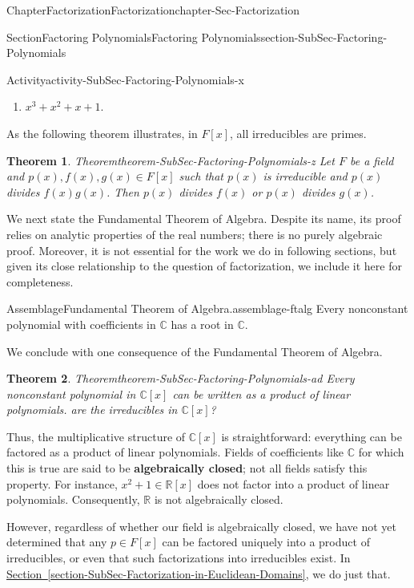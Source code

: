 \documentclass[oneside,10pt,]{book}
\newcommand{\xreffont}{\relax}
\newcommand{\terminology}[1]{\textbf{#1}}
\numberwithin{equation}{section}
\def\C{{\mathbb C}}
\def\R{{\mathbb R}}
\newtheorem{theorem}{Theorem}[section]
\begin{document}
\begin{chapterptx}{Chapter}{Factorization}{}{Factorization}{}{}{chapter-Sec-Factorization}
\begin{sectionptx}{Section}{Factoring Polynomials}{}{Factoring Polynomials}{}{}{section-SubSec-Factoring-Polynomials}
\begin{activity}{Activity}{}{activity-SubSec-Factoring-Polynomials-x}
\begin{enumerate}
\begin{enumerate}
\item{}\(x^3 + x^2 + x + 1\).%
\end{enumerate}
\end{enumerate}
\end{activity}%
As the following theorem illustrates, in \(F[x]\), all irreducibles are primes.%
\begin{theorem}{Theorem}{}{}{theorem-SubSec-Factoring-Polynomials-z}%
Let \(F\) be a field and \(p(x),f(x),g(x)\in F[x]\) such that \(p(x)\) is irreducible and \(p(x)\) divides \(f(x) g(x)\). Then \(p(x)\) divides \(f(x)\) or \(p(x)\) divides \(g(x)\).%
\end{theorem}
We next state the Fundamental Theorem of Algebra. Despite its name, its proof relies on analytic properties of the real numbers; there is no purely algebraic proof. Moreover, it is not essential for the work we do in following sections, but given its close relationship to the question of factorization, we include it here for completeness.%
\begin{assemblage}{Assemblage}{Fundamental Theorem of Algebra.}{assemblage-ftalg}%
Every nonconstant polynomial with coefficients in \(\C\) has a root in \(\C\).%
\end{assemblage}
We conclude with one consequence of the Fundamental Theorem of Algebra.%
\begin{theorem}{Theorem}{}{}{theorem-SubSec-Factoring-Polynomials-ad}%
Every nonconstant polynomial in \(\C[x]\) can be written as a product of linear polynomials.%
\noindentWhat are the irreducibles in \(\C[x]\)?%
\end{theorem}
Thus, the multiplicative structure of \(\C[x]\) is straightforward: everything can be factored as a product of linear polynomials. Fields of coefficients like \(\C\) for which this is true are said to be \terminology{algebraically closed}; not all fields satisfy this property. For instance, \(x^2 + 1\in \R[x]\) does not factor into a product of linear polynomials. Consequently, \(\R\) is not algebraically closed.%
\par
However, regardless of whether our field is algebraically closed, we have not yet determined that any \(p\in F[x]\) can be factored uniquely into a product of irreducibles, or even that such factorizations into irreducibles exist. In \hyperref[section-SubSec-Factorization-in-Euclidean-Domains]{Section~{\xreffont\ref{section-SubSec-Factorization-in-Euclidean-Domains}}}, we do just that.%
\end{sectionptx}
%
%
\typeout{************************************************}

\end{chapterptx}
\end{document}
